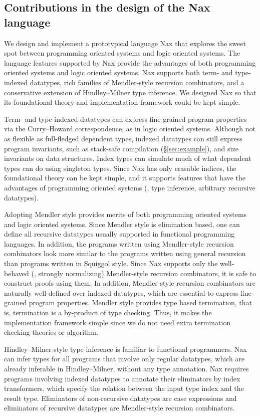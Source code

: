 \subsection{Contributions in the design of the Nax language}
We design and implement a prototypical language Nax that explores
the sweet spot between programming oriented systems and logic oriented systems.
The language features supported by Nax provide the advantages
of both programming oriented systems and logic oriented systems.
Nax supports both term- and type-indexed datatypes,
rich families of Mendler-style recursion combinators,
and a conservative extension of Hindley--Milner type inference.
We designed Nax so that its foundational theory and
implementation framework could be kept simple.

Term- and type-indexed datatypes can express fine grained program properties
via the Curry--Howard correspondence, as in logic oriented systems. Although
not as flexible as full-fledged dependent types, indexed datatypes can
still express program invariants, such as stack-safe compilation
(\S\ref{sec:example}), and size invariants on data structures.
Index types can simulate much of what
dependent types can do using singleton types. Since Nax has only erasable
indices, the foundational theory can be kept simple, and it supports
features that have the advantages of programming oriented systems 
(\eg, type inference, arbitrary recursive datatypes).

Adopting Mendler style provides merits of both programming oriented systems
and logic oriented systems. Since Mendler style is elimination based, one can
define all recursive datatypes usually supported in functional programming
languages. In addition, the programs written using Mendler-style recursion
combinators look more similar to the programs written using general recursion
than programs written in Squiggol style.
Since Nax supports only the well-behaved (\ie, strongly normalizing)
Mendler-style recursion combinators, it is safe to construct proofs using them.
In addition, Mendler-style recursion combinators are naturally well-defined
over indexed datatypes, which are essential to express fine-grained program
properties. Mendler style provides type based termination, that is, termination
is a by-product of type checking. Thus, it makes the implementation framework
simple since we do not need extra termination checking theories or algorithm.

Hindley--Milner-style type inference is familiar to functional programmers.
Nax can infer types for all programs that involve only regular datatypes,
which are already inferable in Hindley--Milner, without any type annotation.
Nax requires programs involving indexed datatypes to annotate their eliminators
by index transformers, which specify the relation between the input type index
and the result type. Eliminators of non-recursive datatypes are case expressions
and eliminators of recursive datatypes are Mendler-style recursion combinators.

